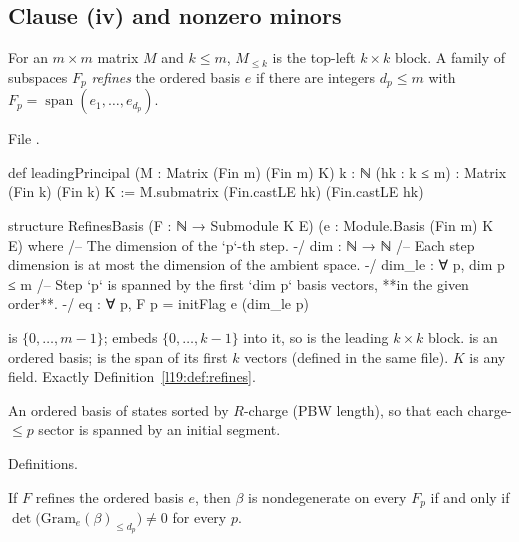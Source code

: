 \subsection{Clause (iv) and nonzero minors}

\begin{definition}\label{l19:def:refines}
For an $m\times m$ matrix $M$ and $k\le m$, $M_{\le k}$ is the top-left $k\times k$ block. A family of
subspaces $F_p$ \emph{refines} the ordered basis $e$ if there are integers $d_p\le m$ with
$F_p = \operatorname{span}(e_1,\dots,e_{d_p})$.
\end{definition}

\noindent File .
\begin{leancode}
def leadingPrincipal (M : Matrix (Fin m) (Fin m) K) {k : ℕ} (hk : k ≤ m) :
    Matrix (Fin k) (Fin k) K :=
  M.submatrix (Fin.castLE hk) (Fin.castLE hk)

structure RefinesBasis (F : ℕ → Submodule K E) (e : Module.Basis (Fin m) K E) where
  /-- The dimension of the `p`-th step. -/
  dim : ℕ → ℕ
  /-- Each step dimension is at most the dimension of the ambient space. -/
  dim_le : ∀ p, dim p ≤ m
  /-- Step `p` is spanned by the first `dim p` basis vectors, **in the given order**. -/
  eq : ∀ p, F p = initFlag e (dim_le p)
\end{leancode}

\begin{dictionary}
 is $\{0,\dots,m-1\}$;  embeds $\{0,\dots,k-1\}$ into it, so
 is the leading $k\times k$ block.
 is an ordered basis;  is the span of its first $k$
vectors (defined in the same file). $K$ is any field. Exactly Definition~\ref{l19:def:refines}.
\end{dictionary}

\begin{physics}
An ordered basis of states sorted by $R$-charge (PBW length), so that each charge-$\le p$ sector is
spanned by an initial segment.
\end{physics}

\begin{status}
Definitions.
\end{status}

\begin{theorem}\label{l19:thm:minors}
If $F$ refines the ordered basis $e$, then $\beta$ is nondegenerate on every $F_p$ if and only if
$\det\big(\mathrm{Gram}_e(\beta)_{\le d_p}\big)\ne0$ for every $p$.
\end{theorem}

